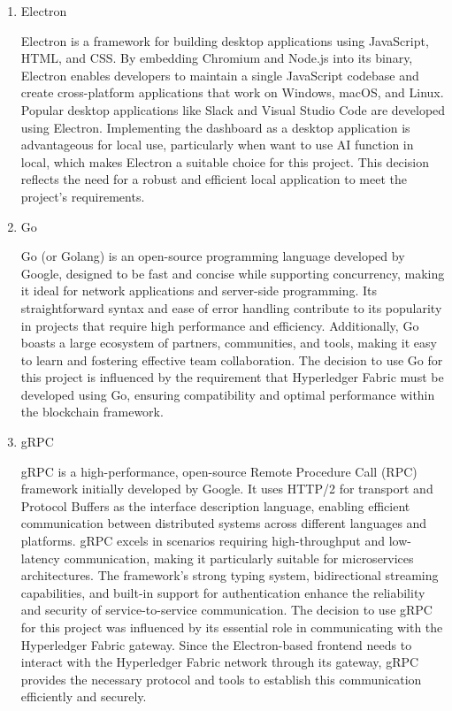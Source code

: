 \documentclass[conference]{IEEEtran}
\begin{document}
\begin{enumerate}[itemsep=2ex, parsep=1ex]
	\item Electron
	      	      
	      	      
	      Electron is a framework for building desktop applications using JavaScript, HTML, and CSS. By embedding Chromium and Node.js into its binary, Electron enables developers to maintain a single JavaScript codebase and create cross-platform applications that work on Windows, macOS, and Linux. Popular desktop applications like Slack and Visual Studio Code are developed using Electron. Implementing the dashboard as a desktop application is advantageous for local use, particularly when want to use AI function in local, which makes Electron a suitable choice for this project. This decision reflects the need for a robust and efficient local application to meet the project’s requirements.
	      	      
	\item Go
	      	      
	      	      
	      Go (or Golang) is an open-source programming language developed by Google, designed to be fast and concise while supporting concurrency, making it ideal for network applications and server-side programming. Its straightforward syntax and ease of error handling contribute to its popularity in projects that require high performance and efficiency. Additionally, Go boasts a large ecosystem of partners, communities, and tools, making it easy to learn and fostering effective team collaboration. The decision to use Go for this project is influenced by the requirement that Hyperledger Fabric must be developed using Go, ensuring compatibility and optimal performance within the blockchain framework.
	      
	\item gRPC
	      
	      gRPC is a high-performance, open-source Remote Procedure Call (RPC) framework initially developed by Google. It uses HTTP/2 for transport and Protocol Buffers as the interface description language, enabling efficient communication between distributed systems across different languages and platforms. gRPC excels in scenarios requiring high-throughput and low-latency communication, making it particularly suitable for microservices architectures. The framework's strong typing system, bidirectional streaming capabilities, and built-in support for authentication enhance the reliability and security of service-to-service communication. The decision to use gRPC for this project was influenced by its essential role in communicating with the Hyperledger Fabric gateway. Since the Electron-based frontend needs to interact with the Hyperledger Fabric network through its gateway, gRPC provides the necessary protocol and tools to establish this communication efficiently and securely.
	      	      

\end{enumerate}
\end{document}
